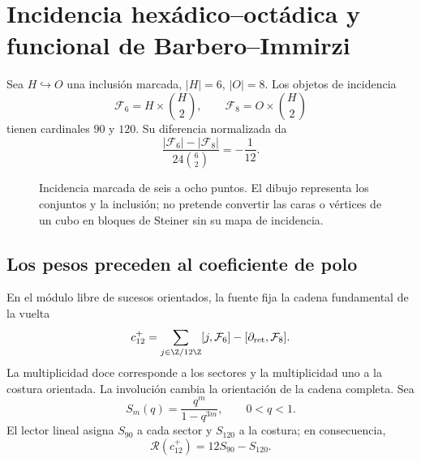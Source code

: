\section{Incidencia hexádico--octádica y funcional de Barbero--Immirzi}
\label{v:ant:sec:barbero}
Sea $H\hookrightarrow O$ una inclusión marcada, $|H|=6$, $|O|=8$.
Los objetos de incidencia
\[
\mathcal F_6=H\times\binom H2,\qquad
\mathcal F_8=O\times\binom H2
\]
tienen cardinales $90$ y $120$. Su diferencia normalizada da
\[
\frac{|\mathcal F_6|-|\mathcal F_8|}{24\binom62}=-\frac1{12}.
\]
\begin{figure}[htbp]
\centering
{}
\caption{Incidencia marcada de seis a ocho puntos. El dibujo representa
los conjuntos y la inclusión; no pretende convertir las caras o vértices
de un cubo en bloques de Steiner sin su mapa de incidencia.}
\end{figure}

\subsection{Los pesos preceden al coeficiente de polo}
En el módulo libre de sucesos orientados, la fuente fija la cadena
fundamental de la vuelta
\[
c_{12}^{+}=
\sum_{j\in\Z/12\Z}[j,\mathcal F_6]
-[\partial_{\rm ret},\mathcal F_8].
\]
La multiplicidad doce corresponde a los sectores y la multiplicidad uno
a la costura orientada. La involución cambia la orientación de la cadena
completa. Sea
\[
S_m(q)=\frac{q^m}{1-q^{3m}},\qquad 0<q<1.
\]
El lector lineal asigna $S_{90}$ a cada sector y $S_{120}$ a la costura;
en consecuencia,
\[
\mathscr R(c_{12}^{+})=12S_{90}-S_{120}.
\]

